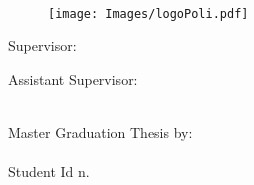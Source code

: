 \begin{titlepage}
    \begin{center}
    	\large
        \spacedlowsmallcaps{\myUni} \\
        \bigskip\myFaculty \\
        \medskip\mySchool \\
    	\medskip\myDepartment \\
    	\bigskip\myCourseFirstPart \\
        \medskip\myCourseSecondPart \\  

        \hfill

        \vfill
        
        \begin{figure}[!h]
			\begin{center}
				\texttt{[image: Images/logoPoli.pdf]} 
			\end{center}
		\end{figure}
		
		\vfill

        \begingroup
       		\huge	
            \color{Maroon} \myTitle
            \large
            \color{Maroon} \mySubtitle
            \bigskip
        \endgroup

        \vfill

		\flushleft 
		\normalsize{Supervisor:}\\
		\medskip\spacedlowsmallcaps{\mySupervisor}

		\flushleft
		\normalsize{Assistant Supervisor:}\\
		\medskip\spacedlowsmallcaps{\myOtherSupervisor}\\
        
        \vfill  
        
        \flushright
        \normalsize{Master Graduation Thesis by:}\\
        \medskip \spacedlowsmallcaps{\myFirstAuthorName}\\
		Student Id n. \myMatrFirstAuthor \\ 
		
		\vfill 

		\centering {\myAcademicYear}                     

    \end{center}  
\end{titlepage}